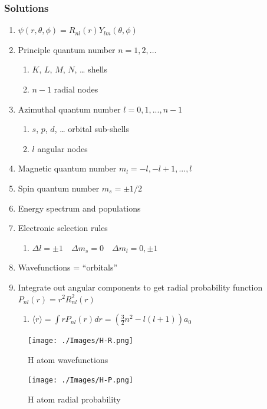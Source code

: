 \documentclass[11pt]{article}
\begin{document}
\subsubsection{Solutions}
\label{sec:org684aebe}
\begin{enumerate}
\item \(\psi(r,\theta,\phi)=R_{nl}(r)Y_{lm}(\theta,\phi)\)
\item Principle quantum number \(n=1,2,\ldots\)
\begin{enumerate}
\item \(K\), \(L\), \(M\), \(N\), \ldots{} shells
\item \(n-1\) radial nodes
\end{enumerate}
\item Azimuthal quantum number \(l=0,1,...,n-1\)
\begin{enumerate}
\item \(s\), \(p\), \(d\), \ldots{} orbital sub-shells
\item \(l\) angular nodes
\end{enumerate}
\item Magnetic quantum number \(m_l=-l,-l+1,...,l\)
\item Spin quantum number \(m_s=\pm 1/2\)
\item Energy spectrum and populations
\item Electronic selection rules
\begin{enumerate}
\item \(\Delta l=\pm 1 \quad \Delta m_s =0 \quad \Delta m_l = 0,\pm 1\)
\end{enumerate}
\item Wavefunctions = ``orbitals''
\item Integrate out angular components to get radial probability function \(P_{nl}(r)=r^2 R_{nl}^2(r)\)
\begin{enumerate}
\item \(\langle r\rangle = \int r P_{nl}(r) dr = \left(\frac{3}{2}n^2-l(l+1)\right)a_0\)
\end{enumerate}
\end{enumerate}

\begin{figure}[htbp]
\centering
\texttt{[image: ./Images/H-R.png]}
\caption{H atom wavefunctions}
\end{figure} 
\begin{figure}[htbp]
\centering
\texttt{[image: ./Images/H-P.png]}
\caption{H atom radial probability}
\end{figure} 
\end{document}
